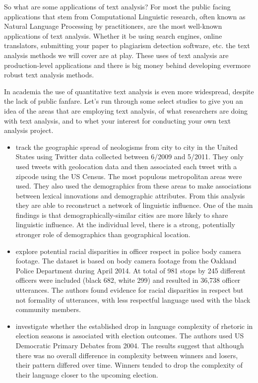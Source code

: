 \documentclass[
]{article}
\newenvironment{rmdblock}[1]
  {\begin{shaded*}
  \begin{itemize}
  \renewcommand{\labelitemi}{
    \raisebox{-.5\height}[0pt][0pt]{
      {\setkeys{Gin}{width=2em,keepaspectratio}\texttt{[image: assets/images/\#1]}}
    }
  }
  \item
  }
  {
  \end{itemize}
  \end{shaded*}
  }
\newenvironment{rmdstudy}
  {\begin{rmdblock}{paper}}
  {\end{rmdblock}}
\begin{document}
So what are some applications of text analysis? For most the public facing applications that stem from Computational Linguistic research, often known as Natural Language Processing by practitioners, are the most well-known applications of text analysis. Whether it be using search engines, online translators, submitting your paper to plagiarism detection software, etc. the text analysis methods we will cover are at play. These uses of text analysis are production-level applications and there is big money behind developing evermore robust text analysis methods.

In academia the use of quantitative text analysis is even more widespread, despite the lack of public fanfare. Let's run through some select studies to give you an idea of the areas that are employing text analysis, of what researchers are doing with text analysis, and to whet your interest for conducting your own text analysis project.

\begin{rmdstudy}
\citet{Eisenstein2012} track the geographic spread of neologisms from city to city in the United States using Twitter data collected between 6/2009 and 5/2011. They only used tweets with geolocation data and then associated each tweet with a zipcode using the US Census. The most populous metropolitan areas were used. They also used the demographics from these areas to make associations between lexical innovations and demographic attributes. From this analysis they are able to reconstruct a network of linguistic influence. One of the main findings is that demographically-similar cities are more likely to share linguistic influence. At the individual level, there is a strong, potentially stronger role of demographics than geographical location.
\end{rmdstudy}

\begin{rmdstudy}
\citet{Voigt2017} explore potential racial disparities in officer respect in police body camera footage. The dataset is based on body camera footage from the Oakland Police Department during April 2014. At total of 981 stops by 245 different officers were included (black 682, white 299) and resulted in 36,738 officer utterances. The authors found evidence for racial disparities in respect but not formality of utterances, with less respectful language used with the black community members.
\end{rmdstudy}

\begin{rmdstudy}
\citet{Conway2012} investigate whether the established drop in language complexity of rhetoric in election seasons is associated with election outcomes. The authors used US Democratic Primary Debates from 2004. The results suggest that although there was no overall difference in complexity between winners and losers, their pattern differed over time. Winners tended to drop the complexity of their language closer to the upcoming election.
\end{rmdstudy}
\end{document}
